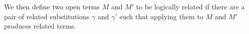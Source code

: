 We then define two open terms $M$ and $M′$ to be logically related
if there are a pair of related substitutions $γ$ and $γ′$ such that
applying them to $M$ and $M′$ produces related terms.

\begin{code}%
\>[0]\AgdaSpace{}%
\AgdaSymbol{:}\AgdaSpace{}%
\AgdaSpace{}%
\AgdaSpace{}%
\AgdaSpace{}%
\AgdaSpace{}%
\AgdaSpace{}%
\AgdaSpace{}%
\AgdaSpace{}%
\AgdaSpace{}%
\AgdaSpace{}%
\AgdaSpace{}%
\AgdaSpace{}%
\<%
\\
\>[0]%
\>[1386I]\AgdaSpace{}%
\AgdaSpace{}%
\AgdaSpace{}%
\AgdaSpace{}%
\AgdaSpace{}%
\AgdaSpace{}%
\AgdaSpace{}%
\AgdaSymbol{(\AgdaUnderscore{}}\AgdaSpace{}%
\AgdaOperator{\AgdaInductiveConstructor{,}}\AgdaSpace{}%
\AgdaSymbol{\AgdaUnderscore{}}\AgdaSpace{}%
\AgdaOperator{\AgdaInductiveConstructor{,}}\AgdaSpace{}%
\AgdaSymbol{)}\AgdaSpace{}%
\AgdaSymbol{=}\AgdaSpace{}%
\AgdaSpace{}%
\AgdaSymbol{(}\AgdaSpace{}%
\AgdaSpace{}%
\AgdaSymbol{:}\AgdaSpace{}%
\AgdaSymbol{)}\<%
\\
\>[1386I][@{}l@{\AgdaIndent{0}}]%
\>[3]\AgdaSpace{}%
\AgdaSymbol{(}\AgdaSpace{}%
\AgdaSpace{}%
\AgdaSpace{}%
\AgdaSpace{}%
\AgdaSpace{}%
\AgdaSpace{}%
\AgdaSymbol{)}\AgdaSpace{}%
\AgdaSpace{}%
\AgdaSpace{}%
\AgdaSpace{}%
\AgdaSymbol{(}\AgdaSpace{}%
\AgdaSpace{}%
\AgdaSpace{}%
\AgdaSymbol{)}\AgdaSpace{}%
\AgdaSpace{}%
\AgdaSymbol{(}\AgdaSpace{}%
\AgdaSpace{}%
\AgdaSpace{}%
\AgdaSymbol{)}\AgdaSpace{}%
\AgdaSpace{}%
\<%
\end{code}

